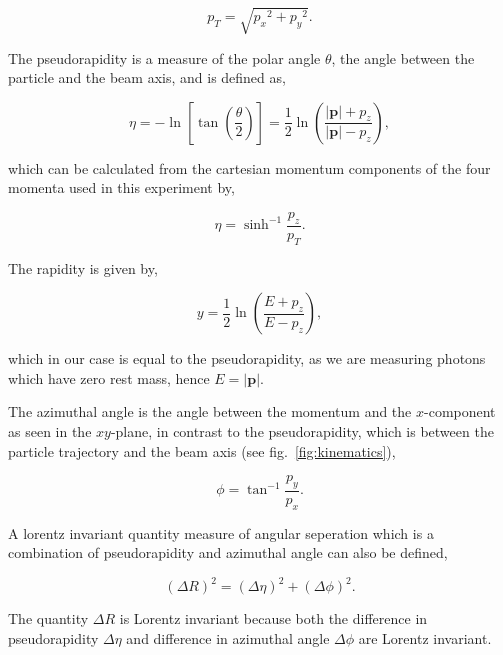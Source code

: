 \documentclass[11pt]{amsart}
\begin{document}
\begin{multicols}{2}
\begin{equation}
  \label{eq:transverse}
  p_T = \sqrt{{p_x}^2 + {p_y}^2}.
\end{equation}

The pseudorapidity is a measure of the polar angle $\theta$, the angle between the particle and the beam axis, and is defined as,

\begin{equation}
  \label{eq:pseudorapdity2}
  \eta = -\ln{\left[\tan{\left(\frac{\theta}{2}\right)}\right]} = \frac{1}{2}\ln{\left(\frac{|\mathbf{p}|+p_z}{|\mathbf{p}|-p_z}\right)},
\end{equation}

\cite{kinematics}

which can be calculated from the cartesian momentum components of the four momenta used in this experiment by,

\begin{equation}
  \label{eq:pseudorapidity}
  \eta = \sinh^{-1} \frac{p_z}{p_T}.
\end{equation}

The rapidity is given by,

\begin{equation}
  \label{eq:rapidity}
  y = \frac{1}{2}\ln{\left(\frac{E + p_z}{E - p_z}\right)},
\end{equation}

which in our case is equal to the pseudorapidity, as we are measuring photons which have zero rest mass, hence $E = |\mathbf{p}|$.

The azimuthal angle is the angle between the momentum and the $x$-component as seen in the $xy$-plane, in contrast to the pseudorapidity, which is between the particle trajectory and the beam axis (see fig.~\ref{fig:kinematics}),

\begin{equation}
  \label{eq:azimuthal}
  \phi = \tan^{-1} \frac{p_y}{p_x}.
\end{equation}

A lorentz invariant quantity measure of angular seperation which is a combination of pseudorapidity and azimuthal angle can also be defined,

\begin{equation}
  \label{eq:angular}
  {(\Delta R)}^2 = {(\Delta \eta)}^2 + {(\Delta \phi)}^2.
\end{equation}

The quantity $\Delta R$ is Lorentz invariant because both the difference in pseudorapidity $\Delta \eta$ and difference in azimuthal angle $\Delta \phi$ are Lorentz invariant. \cite{lorentz}


\end{multicols}
\end{document}
